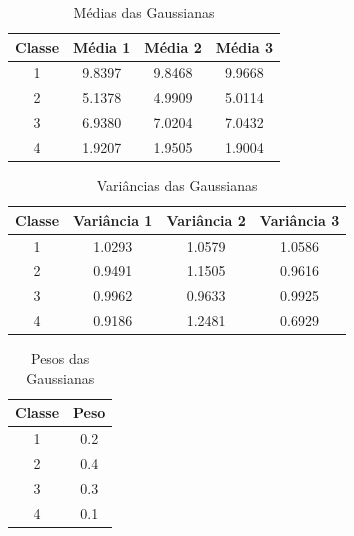 \begin{enumerate}
\begin{tcolorbox}[colback=white, colframe=black, title=Resposta(continuação):]
\end{tcolorbox}

\begin{table}[H]
    \centering
    \caption{Médias das Gaussianas}
    \begin{tabular}{|c|c|c|c|}
        \hline
        Classe & Média 1 & Média 2 & Média 3 \\ \hline
        1 & 9.8397 & 9.8468 & 9.9668 \\ \hline
        2 & 5.1378 & 4.9909 & 5.0114 \\ \hline
        3 & 6.9380 & 7.0204 & 7.0432 \\ \hline
        4 & 1.9207 & 1.9505 & 1.9004 \\ \hline
    \end{tabular}
    \label{tab:means}
\end{table}

\begin{table}[H]
    \centering
    \caption{Variâncias das Gaussianas}
    \begin{tabular}{|c|c|c|c|}
        \hline
        Classe & Variância 1 & Variância 2 & Variância 3 \\ \hline
        1 & 1.0293 & 1.0579 & 1.0586 \\ \hline
        2 & 0.9491 & 1.1505 & 0.9616 \\ \hline
        3 & 0.9962 & 0.9633 & 0.9925 \\ \hline
        4 & 0.9186 & 1.2481 & 0.6929 \\ \hline
    \end{tabular}
    \label{tab:covariances}
\end{table}

\begin{table}[H]
    \centering
    \caption{Pesos das Gaussianas}
    \begin{tabular}{|c|c|}
        \hline
        Classe & Peso \\ \hline
        1 & 0.2 \\ \hline
        2 & 0.4 \\ \hline
        3 & 0.3 \\ \hline
        4 & 0.1 \\ \hline
    \end{tabular}
    \label{tab:weights}
\end{table}


\end{enumerate}

